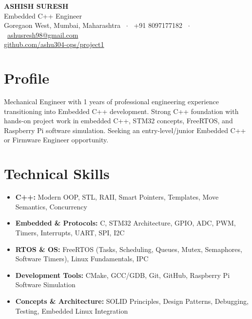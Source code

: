 \documentclass[10pt, a4paper]{article}
\begin{document}
\begin{center}
    {\Huge \textbf{ASHISH SURESH}} \\[4pt]
    Embedded C++ Engineer \\[2pt]
    Goregaon West, Mumbai, Maharashtra \ $\cdot$ \ +91 8097177182 \ $\cdot$ \ \href{mailto:ashusresh98@gmail.com}{ashusresh98@gmail.com} \\
    \href{https://github.com/ashu304-ops/project1}{github.com/ashu304-ops/project1}
\end{center}

\section{Profile}
Mechanical Engineer with 1 years of professional engineering experience transitioning into Embedded C++ development. Strong C++ foundation with hands-on project work in embedded C++, STM32 concepts, FreeRTOS, and Raspberry Pi software simulation. Seeking an entry-level/junior Embedded C++ or Firmware Engineer opportunity.

\section{Technical Skills}
\begin{itemize}
    \item \textbf{C++:} Modern OOP, STL, RAII, Smart Pointers, Templates, Move Semantics, Concurrency
    \item \textbf{Embedded \& Protocols:} C, STM32 Architecture, GPIO, ADC, PWM, Timers, Interrupts, UART, SPI, I2C
    \item \textbf{RTOS \& OS:} FreeRTOS (Tasks, Scheduling, Queues, Mutex, Semaphores, Software Timers), Linux Fundamentals, IPC
    \item \textbf{Development Tools:} CMake, GCC/GDB, Git, GitHub, Raspberry Pi Software Simulation
    \item \textbf{Concepts \& Architecture:} SOLID Principles, Design Patterns, Debugging, Testing, Embedded Linux Integration
\end{itemize}
\end{document}
